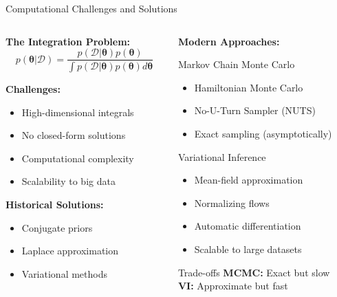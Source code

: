\documentclass[aspectratio=169,11pt]{beamer}
\newcommand{\btheta}{\boldsymbol{\theta}}
\begin{document}
\begin{frame}{Computational Challenges and Solutions}
\begin{columns}
\begin{column}{0.5\textwidth}
\textbf{The Integration Problem:}
\[p(\btheta|\mathcal{D}) = \frac{p(\mathcal{D}|\btheta)p(\btheta)}{\int p(\mathcal{D}|\btheta)p(\btheta)d\btheta}\]

\textbf{Challenges:}
\begin{itemize}
\item High-dimensional integrals
\item No closed-form solutions
\item Computational complexity
\item Scalability to big data
\end{itemize}

\vspace{0.3cm}
\textbf{Historical Solutions:}
\begin{itemize}
\item Conjugate priors
\item Laplace approximation
\item Variational methods
\end{itemize}
\end{column}
\begin{column}{0.5\textwidth}
\textbf{Modern Approaches:}

\begin{block}{Markov Chain Monte Carlo}
\begin{itemize}
\item Hamiltonian Monte Carlo
\item No-U-Turn Sampler (NUTS)
\item Exact sampling (asymptotically)
\end{itemize}
\end{block}

\begin{block}{Variational Inference}
\begin{itemize}
\item Mean-field approximation
\item Normalizing flows
\item Automatic differentiation
\item Scalable to large datasets
\end{itemize}
\end{block}

\begin{alertblock}{Trade-offs}
\textbf{MCMC:} Exact but slow\\
\textbf{VI:} Approximate but fast
\end{alertblock}
\end{column}
\end{columns}
\end{frame}
\end{document}
